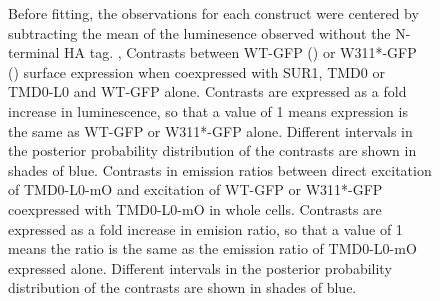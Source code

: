 \begin{figure}[h]
{	Before fitting, the observations for each construct were centered by subtracting the mean of the luminesence observed without the N-terminal HA tag.
	,  Contrasts between WT-GFP () or W311*-GFP () surface expression when coexpressed with SUR1, TMD0 or TMD0-L0 and WT-GFP alone.
	Contrasts are expressed as a fold increase in luminescence, so that a value of 1 means expression is the same as WT-GFP or W311*-GFP alone.
	Different intervals in the posterior probability distribution of the contrasts are shown in shades of blue.
	  Contrasts in emission ratios between direct excitation of TMD0-L0-mO and excitation of WT-GFP or W311*-GFP coexpressed with TMD0-L0-mO in whole cells.
	Contrasts are expressed as a fold increase in emision ratio, so that a value of 1 means the ratio is the same as the emission ratio of TMD0-L0-mO expressed alone.
	Different intervals in the posterior probability distribution of the contrasts are shown in shades of blue.
	}\label{ch6fig:tmd0_assays}
\end{figure}

